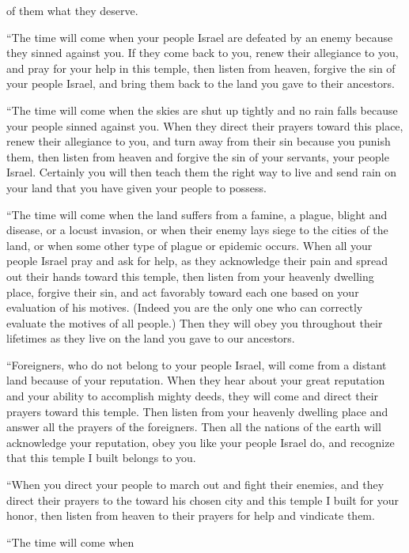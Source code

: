 {of them what they deserve.
\par }{\PP {}“The time will come when your people
Israel
are defeated
by an enemy
because
they sinned
against you. If they come back
to
you, renew
their allegiance
to you, and pray
for your help
in this
temple,
then
listen
from heaven,
forgive
the sin
of your people
Israel,
and bring them back
to
the land
you gave
to their ancestors.
\par }{\PP {}“The time will come when the skies
are shut up
tightly and no
rain
falls because
your people sinned against
you. When they direct their prayers
toward
this
place,
renew
their allegiance
to you, and turn
away from their sin
because
you punish them,
then
listen
from heaven
and forgive
the sin
of your servants,
your people
Israel.
Certainly
you will then teach
them the right
way
to live and send
rain
on
your land
that
you have given
your people
to possess.
\par }{\PP {}“The time will come
when
the land
suffers from a famine,
a plague,
blight
and disease,
or a locust
invasion,
or when
their enemy
lays siege
to the cities
of the land,
or when some other type of plague
or epidemic occurs.
When
all
your people
Israel
pray
and ask for help,
as they acknowledge
their pain
and spread out
their hands
toward
this
temple,
then listen
from your heavenly
dwelling place,
forgive
their sin, and act
favorably toward each
one based on
your evaluation
of his motives.
(Indeed
you
are the only one who can correctly
evaluate
the motives
of all
people.)
Then
they will
obey
you throughout
their
lifetimes
as they
live
on
the land
you gave
to our ancestors.
\par }{\PP {}“Foreigners,
who
do not
belong to your people
Israel,
will come
from a distant
land
because
of your reputation.
When
they hear
about your great
reputation
and your ability
to accomplish mighty
deeds, they will come
and direct
their prayers
toward this
temple.
Then listen
from your heavenly
dwelling place
and answer
all
the prayers
of the foreigners.
Then
all
the nations
of the earth
will acknowledge
your reputation,
obey
you like your people
Israel
do, and recognize
that
this
temple
I built belongs to you.
\par }{\PP {}“When
you direct
your people
to march out and fight
their enemies,
and they direct
their prayers to
the {}
toward
his chosen
city
and this temple
I built
for your honor,
then listen
from heaven
to their prayers
for help
and vindicate them.
\par }{\PP {}“The time will come when
}
